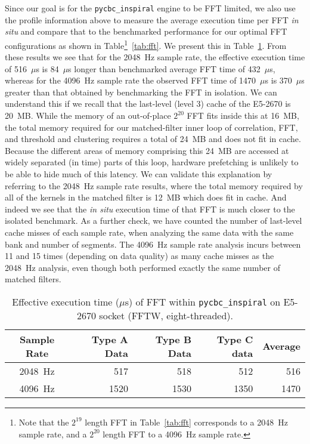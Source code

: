 Since our goal is for the \texttt{pycbc\_inspiral} engine to be FFT limited, we also use the profile information above to
measure the average execution time per FFT
\textit{in situ} and compare that to the benchmarked performance for our
optimal FFT configurations as shown in Table\footnote{Note that the $2^{19}$
length FFT in Table~\ref{tab:fft} corresponds to a 2048~Hz sample rate, and a
$2^{20}$ length FFT to a 4096~Hz sample rate.}~\ref{tab:fft}. We present this in
Table~\ref{tab:insp_fft}. From these results we see that for the 2048~Hz sample
rate, the effective execution time of 516~$\mu$s is 84~$\mu$s longer than
benchmarked average FFT time of 432~$\mu$s, whereas for the 4096~Hz sample rate
the observed FFT time of 1470~$\mu$s is 370~$\mu$s greater than that obtained by
benchmarking the FFT in isolation. We can understand this if we recall that the
last-level (level 3) cache of the E5-2670 is 20~MB.  While the memory of an
out-of-place $2^{20}$ FFT fits inside this at 16~MB, the total memory required
for our matched-filter inner loop of correlation, FFT, and threshold and
clustering requires a total of 24~MB and does not fit in cache. Because the
different areas of memory comprising this 24~MB are accessed at widely separated
(in time) parts of this loop, hardware prefetching is unlikely to be able to
hide much of this latency.  We can validate this explanation by referring to the
2048~Hz sample rate results, where the total memory required by all of the
kernels in the matched filter is 12~MB which does fit in cache. And indeed we
see that the \textit{in situ} execution time of that FFT is much closer to the
isolated benchmark. As a further check, we have counted the number of last-level
cache misses of each sample rate, when analyzing the same data with the same
bank and number of segments. The 4096~Hz sample rate analysis incurs between 11
and 15 times (depending on data quality) as many cache misses as the 2048~Hz
analysis, even though both performed exactly the same number of matched
filters. 

\begin{table}
  \centering
  \begin{tabular}{|c|r|r|r|r|}\hline
   \textbf{Sample Rate} & \textbf{Type A Data}& \textbf{Type B Data} & 
   \textbf{Type C data} & \textbf{Average} \\ \hline
    2048~Hz & 517 & 518 & 512 & 516 \\ \hline
    4096~Hz & 1520 & 1530 & 1350 & 1470 \\ \hline
  \end{tabular}
  \caption{Effective execution time ($\mu$s) of FFT within
    \texttt{pycbc\_inspiral} on E5-2670 socket (FFTW, eight-threaded). }
  \label{tab:insp_fft}
\end{table}

